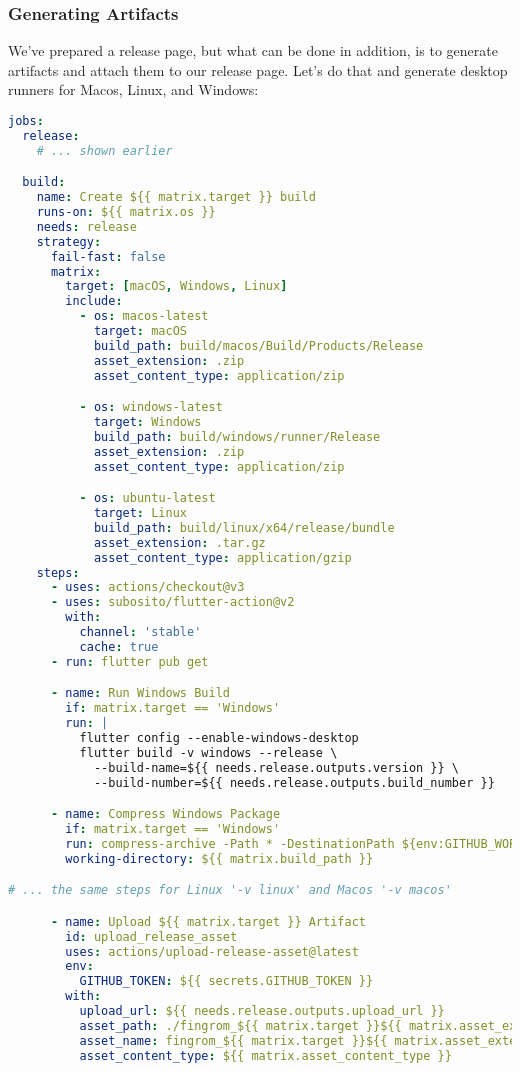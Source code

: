 \subsubsection{Generating Artifacts}

We've prepared a release page, but what can be done in addition, is to generate artifacts and attach them to our release
page. Let's do that and generate desktop runners for Macos, Linux, and Windows:

\begin{lstlisting}[language=yaml]
jobs:
  release: 
    # ... shown earlier

  build:
    name: Create ${{ matrix.target }} build
    runs-on: ${{ matrix.os }}
    needs: release
    strategy:
      fail-fast: false
      matrix:
        target: [macOS, Windows, Linux]
        include:
          - os: macos-latest
            target: macOS
            build_path: build/macos/Build/Products/Release
            asset_extension: .zip
            asset_content_type: application/zip

          - os: windows-latest
            target: Windows
            build_path: build/windows/runner/Release
            asset_extension: .zip
            asset_content_type: application/zip

          - os: ubuntu-latest
            target: Linux
            build_path: build/linux/x64/release/bundle
            asset_extension: .tar.gz
            asset_content_type: application/gzip
    steps:
      - uses: actions/checkout@v3
      - uses: subosito/flutter-action@v2
        with:
          channel: 'stable'
          cache: true
      - run: flutter pub get

      - name: Run Windows Build 
        if: matrix.target == 'Windows'
        run: |
          flutter config --enable-windows-desktop
          flutter build -v windows --release \
            --build-name=${{ needs.release.outputs.version }} \
            --build-number=${{ needs.release.outputs.build_number }}

      - name: Compress Windows Package
        if: matrix.target == 'Windows'
        run: compress-archive -Path * -DestinationPath ${env:GITHUB_WORKSPACE}/fingrom_${{ matrix.target }}${{ matrix.asset_extension }}
        working-directory: ${{ matrix.build_path }}

# ... the same steps for Linux '-v linux' and Macos '-v macos'

      - name: Upload ${{ matrix.target }} Artifact
        id: upload_release_asset
        uses: actions/upload-release-asset@latest
        env:
          GITHUB_TOKEN: ${{ secrets.GITHUB_TOKEN }}
        with:
          upload_url: ${{ needs.release.outputs.upload_url }}
          asset_path: ./fingrom_${{ matrix.target }}${{ matrix.asset_extension }}
          asset_name: fingrom_${{ matrix.target }}${{ matrix.asset_extension }}
          asset_content_type: ${{ matrix.asset_content_type }}
\end{lstlisting}


